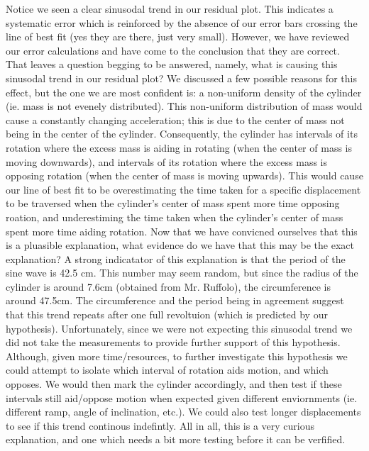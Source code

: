 \documentclass[12pt]{article}
\begin{document}
Notice we seen a clear sinusodal trend in our residual plot. This indicates a systematic error which is reinforced by the absence of our error bars crossing the line of best fit (yes they are there, just very small). However, we have reviewed our error calculations and have come to the conclusion that they are correct. That leaves a question begging to be answered, namely, what is causing this sinusodal trend in our residual plot? We discussed a few possible reasons for this effect, but the one we are most confident is: a non-uniform density of the cylinder (ie. mass is not evenely distributed). This non-uniform distribution of mass would cause a constantly changing acceleration; this is due to the center of mass not being in the center of the cylinder. Consequently, the cylinder has intervals of its rotation where the excess mass is aiding in rotating (when the center of mass is moving downwards), and intervals of its rotation where the excess mass is opposing rotation (when the center of mass is moving upwards). This would cause our line of best fit to be overestimating the time taken for a specific displacement to be traversed when the cylinder's center of mass spent more time opposing roation, and underestiming the time taken when the cylinder's center of mass spent more time aiding rotation. Now that we have convicned ourselves that this is a pluasible explanation, what evidence do we have that this may be the exact explanation? A strong indicatator of this explanation is that the period of the sine wave is 42.5 cm. This number may seem random, but since the radius of the cylinder is around 7.6cm (obtained from Mr. Ruffolo), the circumference is around 47.5cm. The circumference and the period being in agreement suggest that this trend repeats after one full revoltuion (which is predicted by our hypothesis). Unfortunately, since we were not expecting this sinusodal trend we did not take the measurements to provide further support of this hypothesis. Although, given more time/resources, to further investigate this hypothesis we could attempt to isolate which interval of rotation aids motion, and which opposes. We would then mark the cylinder accordingly, and then test if these intervals still aid/oppose motion when expected given different enviornments (ie. different ramp, angle of inclination, etc.).  We could also test longer displacements to see if this trend continous indefintly. All in all, this is a very curious explanation, and one which needs a bit more testing before it can be verfified.

\bigskip
 
\begin{lstlisting}[frame=shadowbox]

\end{lstlisting}
\medskip
\end{document}
